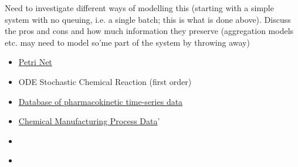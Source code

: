 \documentclass[../Thesis.tex]{subfiles}
\begin{document}
Need to investigate different ways of modelling this (starting with a simple system with no queuing, i.e. a single batch; this is what is done above). Discuss the pros and cons and how much information they preserve (aggregation models etc. may need to model so'me part of the system by throwing away)


\begin{itemize}
    \item \href{https://en.wikipedia.org/wiki/Petri_net}{Petri Net}
    \item ODE Stochastic Chemical Reaction (first order)
    \item \href{https://www.nature.com/articles/s41597-020-0455-1}{Database of pharmacokinetic time-series data}
    \item \href{https://search.r-project.org/CRAN/refmans/AppliedPredictiveModeling/html/ChemicalManufacturingProcess.html}{Chemical Manufacturing Process Data}'
    \item \cite[sample reference]{TuringAward07}
    \item \cite{Balbo2007}
\end{itemize}
\end{document}
